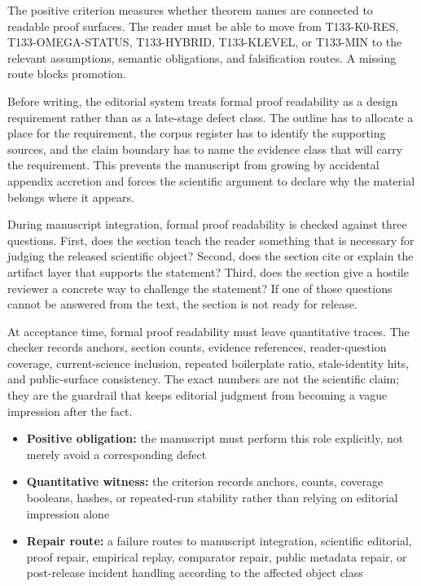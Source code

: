 The positive criterion measures whether theorem names are connected to readable proof surfaces. The reader must be able to move from T133-K0-RES, T133-OMEGA-STATUS, T133-HYBRID, T133-KLEVEL, or T133-MIN to the relevant assumptions, semantic obligations, and falsification routes. A missing route blocks promotion.


Before writing, the editorial system treats formal proof readability as a design requirement rather than as a late-stage defect class. The outline has to allocate a place for the requirement, the corpus register has to identify the supporting sources, and the claim boundary has to name the evidence class that will carry the requirement. This prevents the manuscript from growing by accidental appendix accretion and forces the scientific argument to declare why the material belongs where it appears.


During manuscript integration, formal proof readability is checked against three questions. First, does the section teach the reader something that is necessary for judging the released scientific object? Second, does the section cite or explain the artifact layer that supports the statement? Third, does the section give a hostile reviewer a concrete way to challenge the statement? If one of those questions cannot be answered from the text, the section is not ready for release.


At acceptance time, formal proof readability must leave quantitative traces. The checker records anchors, section counts, evidence references, reader-question coverage, current-science inclusion, repeated boilerplate ratio, stale-identity hits, and public-surface consistency. The exact numbers are not the scientific claim; they are the guardrail that keeps editorial judgment from becoming a vague impression after the fact.


\begin{itemize}[leftmargin=1.8em]

\item \textbf{Positive obligation:} the manuscript must perform this role explicitly, not merely avoid a corresponding defect

\item \textbf{Quantitative witness:} the criterion records anchors, counts, coverage booleans, hashes, or repeated-run stability rather than relying on editorial impression alone

\item \textbf{Repair route:} a failure routes to manuscript integration, scientific editorial, proof repair, empirical replay, comparator repair, public metadata repair, or post-release incident handling according to the affected object class

\end{itemize}

